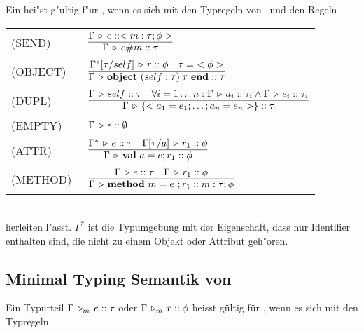 Ein  hei"st g"ultig f"ur \LTWOO, wenn es sich mit den Typregeln von \LTWO\ und den Regeln\\[3mm]
\begin{tabular}{ll}
  \mbox{(SEND)\   } & $\regel{\Tj{\Gamma}{e}{<m:\tau;\phi>}}
                           {\Tj{\Gamma}{\send{e}{m}}{\tau}}$\\[5mm]
  \mbox{(OBJECT)\ } & $\regel{\Tj{\Gamma^*[\tau/self]}{r}{\phi}
                             \quad \tau =\ \objecttype{\phi}}
                             {\Tj{\Gamma}{\object{self:\tau}{r}}{\tau}}$\\[5mm]
  \mbox{(DUPL)\   } & $\regel{\Tj{\Gamma}{self}{\tau}
                              \quad \forall i = 1 \ldots n :
                              \Tj{\Gamma}{a_i}{\tau_i} \wedge
                              \Tj{\Gamma}{e_i}{\tau_i}}
                             {\Tj{\Gamma}{\{< a_1 = e_1;\ldots;a_n = e_n >\}}{\tau}}$\\[5mm]
  \mbox{(EMPTY)\  } & $\Gamma \, \triangleright \, \epsilon\mathrel{::}\emptyset$\\[5mm]
  \mbox{(ATTR)\   } & $\regel{\Tj{\Gamma^*}{e}{\tau}
                              \quad \Tj{\Gamma[\tau/a]}{r_1}{\phi}}
                             {\Tj{\Gamma}{\val{a}{e}r_1}{\phi}}$ \\[5mm]
  \mbox{(METHOD)\ } & $\regel{\Tj{\Gamma}{e}{\tau}
                              \quad \Tj{\Gamma}{r_1}{\phi}}
                             {\Tj{\Gamma}{\method{m}{e}r_1}{m:\tau;\phi}}$
\end{tabular}\\[7mm]
herleiten l"asst. $\Gamma^*$ ist die Typumgebung mit der Eigenschaft, dass nur Identifier enthalten sind,
die nicht zu einem Objekt oder Attribut geh"oren.

\subsection{Minimal Typing Semantik von \LTWOO}

  Ein Typurteil $\Gamma\,\triangleright_m\,e\mathrel{::}\tau$ oder $\Gamma\,\triangleright_m\,r\mathrel{::}\phi$ heisst g\"ultig f\"ur \Lom,
  wenn es sich mit den  Typregeln \\[5mm]

